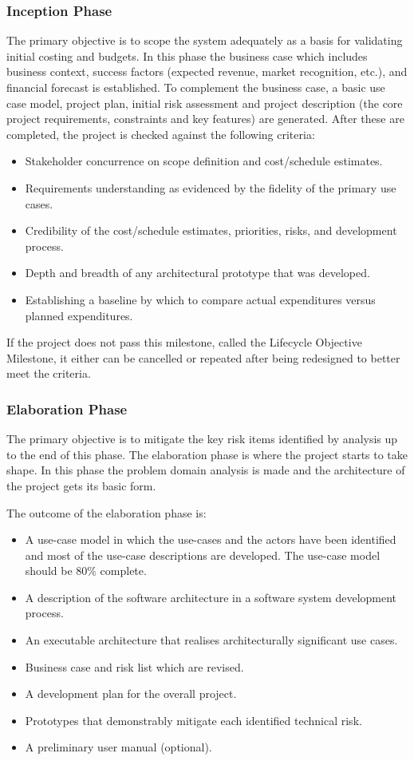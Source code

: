 \subsubsection{Inception Phase}

The primary objective is to scope the system adequately as a basis for validating initial costing and budgets. In this phase the business case which includes business context, success factors (expected revenue, market recognition, etc.), and financial forecast is established. To complement the business case, a basic use case model, project plan, initial risk assessment and project description (the core project requirements, constraints and key features) are generated. After these are completed, the project is checked against the following criteria:
\begin{itemize}
\item Stakeholder concurrence on scope definition and cost/schedule estimates.
\item Requirements understanding as evidenced by the fidelity of the primary use cases.
\item Credibility of the cost/schedule estimates, priorities, risks, and development process.
\item Depth and breadth of any architectural prototype that was developed.
\item Establishing a baseline by which to compare actual expenditures versus planned expenditures.
\end{itemize}

If the project does not pass this milestone, called the Lifecycle Objective Milestone, it either can be cancelled or repeated after being redesigned to better meet the criteria.

\subsubsection{Elaboration Phase}
The primary objective is to mitigate the key risk items identified by analysis up to the end of this phase. The elaboration phase is where the project starts to take shape. In this phase the problem domain analysis is made and the architecture of the project gets its basic form.

The outcome of the elaboration phase is:
\begin{itemize}
\item A use-case model in which the use-cases and the actors have been identified and most of the use-case descriptions are developed. The use-case model should be 80\% complete.
\item A description of the software architecture in a software system development process.
\item An executable architecture that realises architecturally significant use cases.
\item Business case and risk list which are revised.
\item A development plan for the overall project.
\item Prototypes that demonstrably mitigate each identified technical risk.
\item A preliminary user manual (optional).
\end{itemize}


